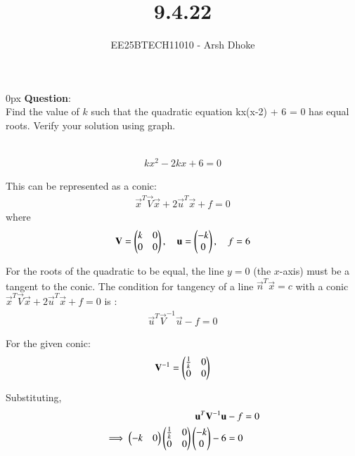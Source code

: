 \documentclass[journal]{IEEEtran}
\begin{document}

\vspace{3cm}

\title{9.4.22}
\author{EE25BTECH11010 - Arsh Dhoke}
{\let\newpage\relax\maketitle}

\renewcommand{\thefigure}{\theenumi}
\renewcommand{\thetable}{\theenumi}
\setlength{\intextsep}{10pt}
\renewcommand{\thetable}{\theenumi}

\parindent 0px
\textbf{Question}:\\
Find the value of $k$ such that the quadratic equation
kx(x-2) + 6 = 0 has equal roots. Verify your solution using graph.

\solution \\


\begin{align}
kx^2 - 2kx + 6 = 0
\end{align}

This can be represented as a conic:
\begin{align}
\vec{x}^{T}\vec{V}\vec{x} + 2\vec{u}^{T}\vec{x} + f = 0
\end{align}
where
\begin{align}
\mathbf{V} = \begin{pmatrix}k & 0 \\ 0 & 0\end{pmatrix}, \quad
\mathbf{u} = \begin{pmatrix}-k \\ 0\end{pmatrix}, \quad
f = 6
\end{align}

For the roots of the quadratic to be equal, the line $y=0$ (the $x$-axis)
must be a tangent to the conic.
The condition for tangency of a line $\vec{n}^{T}\vec{x} = c$
with a conic $\vec{x}^{T}\vec{V}\vec{x} + 2\vec{u}^{T}\vec{x} + f = 0$
is :
\begin{align}
\vec{u}^{T}\vec{V}^{-1}\vec{u} - f = 0
\end{align}

For the given conic:
\begin{align}
\mathbf{V}^{-1} = \begin{pmatrix}\frac{1}{k} & 0 \\ 0 & 0\end{pmatrix}
\end{align}

Substituting,
\begin{align}
\mathbf{u}^{T}\mathbf{V}^{-1}\mathbf{u} - f &= 0 \\
\implies
\begin{pmatrix}-k & 0\end{pmatrix}
\begin{pmatrix}\frac{1}{k} & 0 \\ 0 & 0\end{pmatrix}
\begin{pmatrix}-k \\ 0\end{pmatrix} - 6 = 0 
\end{align}
\end{document}

